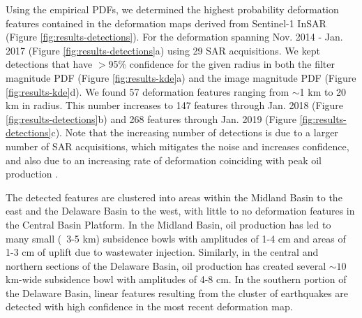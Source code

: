 \documentclass{utexasthesis}
\begin{document}
Using the empirical PDFs, we determined the highest probability deformation features contained in the deformation maps derived from Sentinel-1 InSAR (Figure \ref{fig:results-detections}). For the deformation spanning Nov. 2014 - Jan. 2017 (Figure \ref{fig:results-detections}a) using 29 SAR acquisitions. 
We kept detections that have $ > $95\% confidence for the given radius in both the filter magnitude PDF (Figure \ref{fig:results-kde}a) and the image magnitude PDF (Figure \ref{fig:results-kde}d).
We found 57 deformation features ranging from $\sim$1 km to 20 km in radius. This number increases to 147 features through Jan. 2018 (Figure \ref{fig:results-detections}b) and 268 features through Jan. 2019 (Figure \ref{fig:results-detections}c). Note that the increasing number of detections is due to a larger number of SAR acquisitions, which mitigates the noise and increases confidence, and also due to an increasing rate of deformation coinciding with peak oil production \cite{Staniewicz2020InsarRevealsComplex}.

The detected features are clustered into areas within the Midland Basin to the east and the Delaware Basin to the west, with little to no deformation features in the Central Basin Platform. In the Midland Basin, oil production has led to many small (~3-5 km) subsidence bowls with amplitudes of 1-4 cm and areas of 1-3 cm of uplift due to wastewater injection.
Similarly, in the central and northern sections of the Delaware Basin, oil production has created several $\sim10$ km-wide subsidence bowl with amplitudes of 4-8 cm. In the southern portion of the Delaware Basin, linear features resulting from the cluster of earthquakes are detected with high confidence  in the most recent deformation map.
\end{document}
